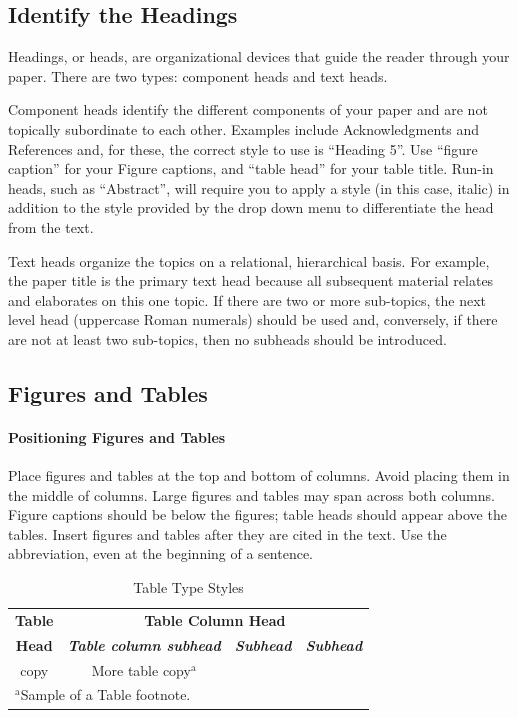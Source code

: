 \documentclass[conference]{IEEEtran}
\begin{document}
\subsection{Identify the Headings}
Headings, or heads, are organizational devices that guide the reader through 
your paper. There are two types: component heads and text heads.

Component heads identify the different components of your paper and are not 
topically subordinate to each other. Examples include Acknowledgments and 
References and, for these, the correct style to use is ``Heading 5''. Use 
``figure caption'' for your Figure captions, and ``table head'' for your 
table title. Run-in heads, such as ``Abstract'', will require you to apply a 
style (in this case, italic) in addition to the style provided by the drop 
down menu to differentiate the head from the text.

Text heads organize the topics on a relational, hierarchical basis. For 
example, the paper title is the primary text head because all subsequent 
material relates and elaborates on this one topic. If there are two or more 
sub-topics, the next level head (uppercase Roman numerals) should be used 
and, conversely, if there are not at least two sub-topics, then no subheads 
should be introduced.

\subsection{Figures and Tables}
\paragraph{Positioning Figures and Tables} Place figures and tables at the top and 
bottom of columns. Avoid placing them in the middle of columns. Large 
figures and tables may span across both columns. Figure captions should be 
below the figures; table heads should appear above the tables. Insert 
figures and tables after they are cited in the text. Use the abbreviation,
even at the beginning of a sentence.

\begin{table}[htbp]
\caption{Table Type Styles}
\begin{center}
\begin{tabular}{|c|c|c|c|}
\hline
\textbf{Table}&\multicolumn{3}{|c|}{\textbf{Table Column Head}} \\
\cline{2-4} 
\textbf{Head} & \textbf{\textit{Table column subhead}}& \textbf{\textit{Subhead}}& \textbf{\textit{Subhead}} \\
\hline
copy& More table copy$^{\mathrm{a}}$& &  \\
\hline
\multicolumn{4}{l}{$^{\mathrm{a}}$Sample of a Table footnote.}
\end{tabular}
\label{tab2}
\end{center}
\end{table}
\end{document}

